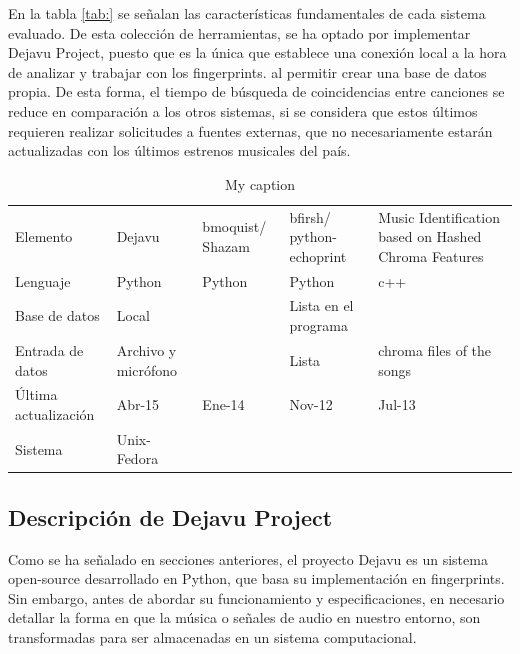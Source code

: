 En la tabla \ref{tab:} se señalan las características fundamentales de cada sistema evaluado. De esta colección de herramientas, se ha optado por implementar Dejavu Project, puesto que es la única que establece una conexión local a la hora de analizar y trabajar con los fingerprints. al permitir crear una base de datos propia. De esta forma, el tiempo de búsqueda de coincidencias entre canciones se reduce en comparación a los otros sistemas, si se considera que estos últimos requieren realizar solicitudes a fuentes externas, que no necesariamente estarán actualizadas con los últimos estrenos musicales del país.

\FloatBarrier
\begin{table}[h!]
\centering
\caption{My caption}
\label{tab:CuadroComparativoApis}
\begin{tabular}{lllll}
Elemento             & Dejavu              & bmoquist/ Shazam & bfirsh/ python-echoprint & Music Identification based on Hashed Chroma Features \\
Lenguaje             & Python              & Python           & Python                   & c++                                                  \\
Base de datos        & Local               &                  & Lista en el programa     &                                                      \\
Entrada de datos     & Archivo y micrófono &                  & Lista                    & chroma files of the songs                            \\
Última actualización & Abr-15              & Ene-14           & Nov-12                   & Jul-13                                               \\
Sistema              & Unix-Fedora         &                  &                          &                                                     
\end{tabular}
\end{table}



\subsection{Descripción de Dejavu Project} \label{subsec:DescDejavu}


Como se ha señalado en secciones anteriores, el proyecto Dejavu es un sistema open-source desarrollado en Python, que basa su implementación en fingerprints. Sin embargo, antes de abordar su funcionamiento y especificaciones, en necesario detallar la forma en que la música o señales de audio en nuestro entorno, son transformadas para ser almacenadas en un sistema computacional.



